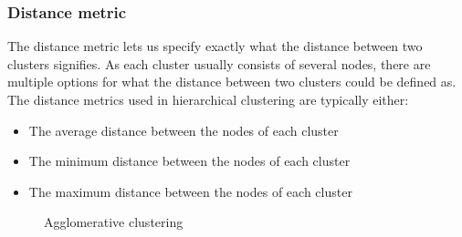 \subsubsection{Distance metric}
The distance metric lets us specify exactly what the distance between two clusters signifies. As each cluster usually consists of several nodes, there are multiple
options for what the distance between two clusters could be defined as. The distance metrics used in hierarchical clustering are typically either:

\begin{itemize}
	\itemsep0em 
	\item The average distance between the nodes of each cluster
	\item The minimum distance between the nodes of each cluster
	\item The maximum distance between the nodes of each cluster
\end{itemize}


\begin{figure}
		\centering
	\caption{Agglomerative clustering}
	\label{fig:agglomerative}
\end{figure}



